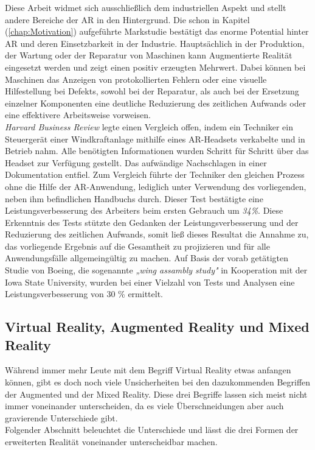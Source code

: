 Diese Arbeit widmet sich ausschließlich dem industriellen Aspekt und stellt andere Bereiche der \acl{AR} in den Hintergrund.
Die schon in Kapitel (\ref{chap:Motivation}) aufgeführte Markstudie bestätigt das enorme Potential hinter \acl{AR} und deren Einsetzbarkeit 
in der Industrie. Hauptsächlich in der Produktion, der Wartung oder der Reparatur von Maschinen kann Augmentierte Realität eingesetzt werden 
und zeigt einen positiv erzeugten Mehrwert. Dabei können bei Maschinen das Anzeigen von protokollierten Fehlern oder eine visuelle 
Hilfestellung bei Defekts, sowohl bei der Reparatur, als auch bei der Ersetzung einzelner Komponenten eine deutliche Reduzierung des 
zeitlichen Aufwands oder eine effektivere Arbeitsweise vorweisen. 
\\
\textit{Harvard Business Review} legte einen Vergleich offen, indem ein Techniker ein Steuergerät einer Windkraftanlage mithilfe 
eines \acs{AR}-Headsets verkabelte und in Betrieb nahm. Alle benötigten Informationen wurden Schritt für Schritt über das Headset zur Verfügung 
gestellt. %
Das aufwändige Nachschlagen in einer Dokumentation entfiel. %
Zum Vergleich führte der Techniker den gleichen Prozess ohne die Hilfe der AR-Anwendung, lediglich unter Verwendung des vorliegenden, neben 
ihm befindlichen Handbuchs durch.
Dieser Test bestätigte eine Leistungsverbesserung des Arbeiters beim ersten Gebrauch um \textit{34\%}.\cite{harvardbr.2017m} Diese Erkenntnis 
des Tests stützte den Gedanken der Leistungsverbesserung und der Reduzierung des zeitlichen Aufwands, somit ließ dieses Resultat die Annahme zu, 
das vorliegende Ergebnis auf die Gesamtheit zu projizieren und für alle Anwendungsfälle allgemeingültig zu machen. Auf Basis der 
vorab getätigten Studie von Boeing, die sogenannte \textit{„wing assambly study"} in Kooperation mit der Iowa State University, wurden 
bei einer Vielzahl von Tests und Analysen eine Leistungsverbesserung von 30 \% ermittelt. \cite{boeingStudy.2015a}


\subsection{Virtual Reality, Augmented Reality und Mixed Reality}
Während immer mehr Leute mit dem Begriff Virtual Reality etwas anfangen können, gibt es doch noch viele Unsicherheiten bei den dazukommenden 
Begriffen der Augmented und der Mixed Reality. Diese drei Begriffe lassen sich meist nicht immer voneinander unterscheiden, da es viele 
Überschneidungen aber auch gravierende Unterschiede gibt. 
\\ 
Folgender Abschnitt beleuchtet die Unterschiede und lässt die drei Formen der erweiterten Realität voneinander unterscheidbar machen.
